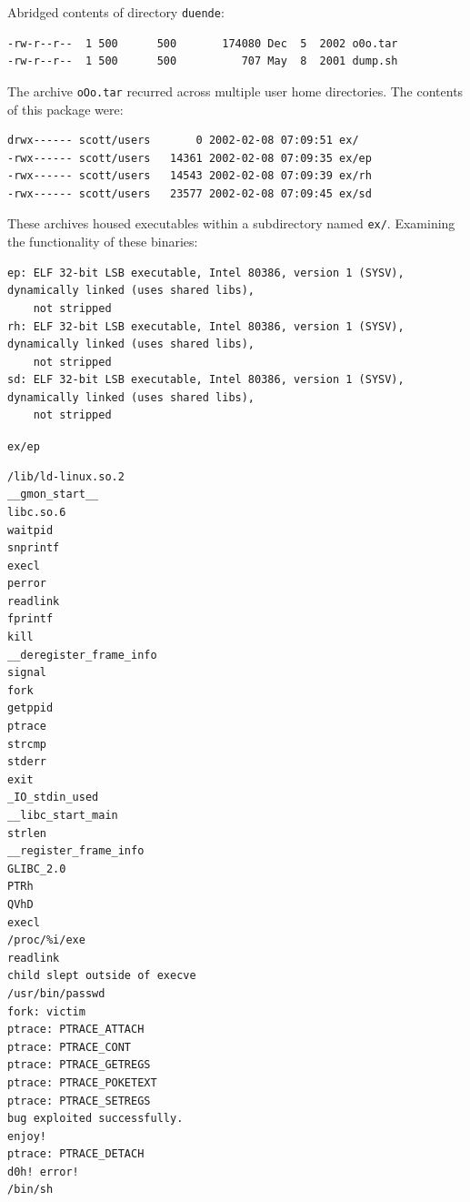 \vspace{1em}

Abridged contents of directory \texttt{duende}:
 
\vspace{1em}

\begin{lstlisting}[style=terminal]
-rw-r--r--  1 500      500       174080 Dec  5  2002 o0o.tar
-rw-r--r--  1 500      500          707 May  8  2001 dump.sh
\end{lstlisting}

\vspace{1em}


The archive \texttt{oOo.tar} recurred across multiple user home directories. The contents of this package were:
 
\vspace{1em}

\begin{lstlisting}[style=terminal]
drwx------ scott/users       0 2002-02-08 07:09:51 ex/
-rwx------ scott/users   14361 2002-02-08 07:09:35 ex/ep
-rwx------ scott/users   14543 2002-02-08 07:09:39 ex/rh
-rwx------ scott/users   23577 2002-02-08 07:09:45 ex/sd
\end{lstlisting}

\vspace{1em}

These archives housed executables within a subdirectory named \texttt{ex/}. Examining the functionality of these binaries:
 
\vspace{1em}

\begin{lstlisting}[style=terminal]
ep: ELF 32-bit LSB executable, Intel 80386, version 1 (SYSV), dynamically linked (uses shared libs), 
    not stripped
rh: ELF 32-bit LSB executable, Intel 80386, version 1 (SYSV), dynamically linked (uses shared libs), 
    not stripped
sd: ELF 32-bit LSB executable, Intel 80386, version 1 (SYSV), dynamically linked (uses shared libs), 
    not stripped
\end{lstlisting}

\vspace{1em}

\texttt{ex/ep}


\vspace{1em}

\begin{lstlisting}[style=terminal]
/lib/ld-linux.so.2
__gmon_start__
libc.so.6
waitpid
snprintf
execl
perror
readlink
fprintf
kill
__deregister_frame_info
signal
fork
getppid
ptrace
strcmp
stderr
exit
_IO_stdin_used
__libc_start_main
strlen
__register_frame_info
GLIBC_2.0
PTRh
QVhD
execl
/proc/%i/exe
readlink
child slept outside of execve
/usr/bin/passwd
fork: victim
ptrace: PTRACE_ATTACH
ptrace: PTRACE_CONT
ptrace: PTRACE_GETREGS
ptrace: PTRACE_POKETEXT
ptrace: PTRACE_SETREGS
bug exploited successfully.
enjoy!
ptrace: PTRACE_DETACH
d0h! error!
/bin/sh
\end{lstlisting}


